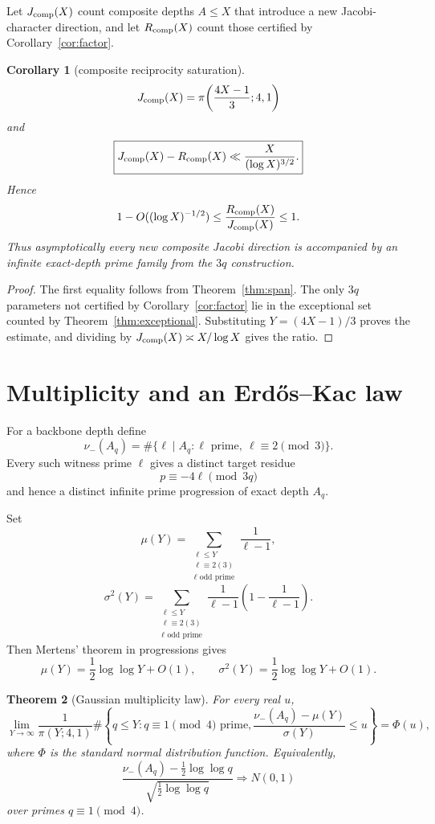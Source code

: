 \documentclass[11pt]{article}
\newtheorem{theorem}{Theorem}
\newtheorem{corollary}[theorem]{Corollary}
\theoremstyle{definition}
\begin{document}
Let $J_{\rm comp}(X)$ count composite depths $A\le X$ that introduce a new Jacobi-character direction, and let $R_{\rm comp}(X)$ count those certified by Corollary~\ref{cor:factor}.

\begin{corollary}[composite reciprocity saturation]\label{cor:saturation}
\[
J_{\rm comp}(X)=\pi\!\left(\frac{4X-1}{3};4,1\right)
\]
and
\[
\boxed{
J_{\rm comp}(X)-R_{\rm comp}(X)
\ll\frac{X}{(\log X)^{3/2}}.
}
\]
Hence
\[
1-O((\log X)^{-1/2})
\le
\frac{R_{\rm comp}(X)}{J_{\rm comp}(X)}
\le1.
\]
Thus asymptotically every new composite Jacobi direction is accompanied by an infinite exact-depth prime family from the $3q$ construction.
\end{corollary}

\begin{proof}
The first equality follows from Theorem~\ref{thm:span}. The only $3q$ parameters not certified by Corollary~\ref{cor:factor} lie in the exceptional set counted by Theorem~\ref{thm:exceptional}. Substituting $Y=(4X-1)/3$ proves the estimate, and dividing by $J_{\rm comp}(X)\asymp X/\log X$ gives the ratio.
\end{proof}

\section{Multiplicity and an Erd\H{o}s--Kac law}
For a backbone depth define
\[
\nu_-(A_q)=\#\{\ell\mid A_q:\ell\text{ prime},\ \ell\equiv2\pmod3\}.
\]
Every such witness prime $\ell$ gives a distinct target residue
\[
p\equiv-4\ell\pmod{3q}
\]
and hence a distinct infinite prime progression of exact depth $A_q$.

Set
\[
\mu(Y)=\sum_{\substack{\ell\le Y\\\ell\equiv2(3)\\\ell\text{ odd prime}}}\frac1{\ell-1},
\]
\[
\sigma^2(Y)=\sum_{\substack{\ell\le Y\\\ell\equiv2(3)\\\ell\text{ odd prime}}}
\frac1{\ell-1}\left(1-\frac1{\ell-1}\right).
\]
Then Mertens' theorem in progressions gives
\[
\mu(Y)=\frac12\log\log Y+O(1),
\qquad
\sigma^2(Y)=\frac12\log\log Y+O(1).
\]

\begin{theorem}[Gaussian multiplicity law]\label{thm:ek}
For every real $u$,
\[
\boxed{
\lim_{Y\to\infty}
\frac1{\pi(Y;4,1)}
\#\left\{q\le Y:q\equiv1\pmod4\text{ prime},
\frac{\nu_-(A_q)-\mu(Y)}{\sigma(Y)}\le u\right\}
=\Phi(u),
}
\]
where $\Phi$ is the standard normal distribution function. Equivalently,
\[
\frac{\nu_-(A_q)-\frac12\log\log q}
{\sqrt{\frac12\log\log q}}
\Longrightarrow N(0,1)
\]
over primes $q\equiv1\pmod4$.
\end{theorem}
\end{document}
